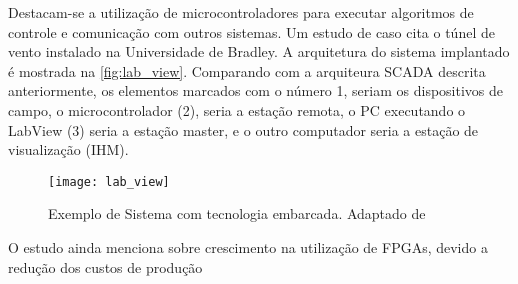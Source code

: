 		Destacam-se a utilização de microcontroladores para executar algoritmos de controle e comunicação com outros sistemas. Um estudo de caso cita o túnel de vento instalado na Universidade de Bradley. A arquitetura do sistema implantado é mostrada na \autoref{fig:lab_view}. Comparando com a arquiteura SCADA descrita anteriormente, os elementos marcados com o número 1, seriam os dispositivos de campo, o microcontrolador (2), seria a estação remota, o PC executando o LabView (3) seria a estação master, e o outro computador seria a estação de visualização (IHM).
		
		\begin{figure}[!htb]	
			\captionsetup{justification=centering}
			\begin{center}
				\texttt{[image: lab\_view]}  %
				\caption[Exemplo de Sistema com tecnologia embarcada]{\label{fig:lab_view}Exemplo de Sistema com tecnologia embarcada. Adaptado de \textcite{yu2011}}
			\end{center}		
		\end{figure}
	
		O estudo ainda menciona sobre crescimento na utilização de FPGAs, devido a redução dos custos de produção 
	
